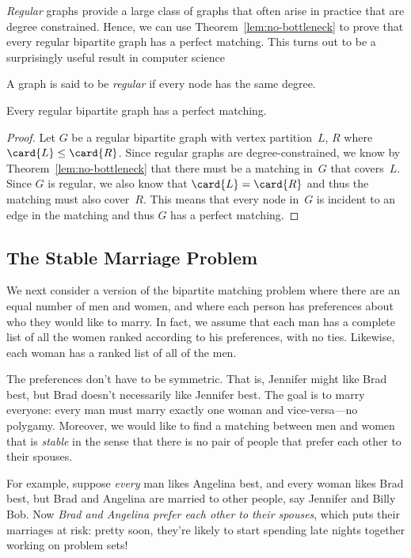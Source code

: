 \emph{Regular} graphs provide a large class of graphs that often arise
in practice that are degree constrained.  Hence, we can use
Theorem~\ref{lem:no-bottleneck} to prove that every regular bipartite
graph has a perfect matching.  This turns out to be a surprisingly
useful result in computer science

\begin{definition}\label{def:5P}
A graph is said to be \emph{regular} if every node has the same degree.
\end{definition}

\begin{theorem}\label{thm:5M}
Every regular bipartite graph has a perfect matching.
\end{theorem}

\begin{proof}
Let $G$ be a regular bipartite graph with vertex partition~$L$, $R$
where $\card{L} \leq \card{R}$.  Since regular graphs are
degree-constrained, we know by Theorem~\ref{lem:no-bottleneck} that
there must be a matching in~$G$ that covers~$L$.  Since $G$ is
regular, we also know that $\card{L} = \card{R}$ and thus the matching
must also cover~$R$.  This means that every node in~$G$ is incident to
an edge in the matching and thus $G$ has a perfect matching.
\end{proof}

\subsection{The Stable Marriage Problem}
\label{stablemarriagesec}

We next consider a version of the bipartite matching problem where
there are an equal number of men and women, and where each person has
preferences about who they would like to marry.  In fact, we assume
that each man has a complete list of all the women ranked according
to his preferences, with no ties.  Likewise, each woman has a ranked
list of all of the men.

The preferences don't have to be symmetric.  That is, Jennifer might
like Brad best, but Brad doesn't necessarily like Jennifer best.  The
goal is to marry everyone: every man must marry exactly one woman and
vice-versa---no polygamy.  Moreover, we would like to find a matching
between men and women that is \emph{stable} in the sense that there is
no pair of people that prefer each other to their spouses.

For example, suppose \emph{every} man likes Angelina best, and every
woman likes Brad best, but Brad and Angelina are married to other
people, say Jennifer and Billy Bob.  Now \emph{Brad and Angelina
  prefer each other to their spouses}, which puts their marriages at
risk: pretty soon, they're likely to start spending late nights
together working on problem sets!

